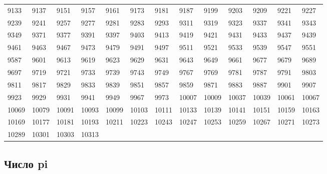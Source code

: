 \documentclass[12pt, a6paper]{extarticle}
\begin{document}
\begin{longtable}{lllll lllll lll}
9133 &9137 &9151 &9157 &9161 &9173 &9181 &9187 &9199 &9203 &9209 &9221 &9227 \\
9239 &9241 &9257 &9277 &9281 &9283 &9293 &9311 &9319 &9323 &9337 &9341 &9343 \\
9349 &9371 &9377 &9391 &9397 &9403 &9413 &9419 &9421 &9431 &9433 &9437 &9439 \\
9461 &9463 &9467 &9473 &9479 &9491 &9497 &9511 &9521 &9533 &9539 &9547 &9551 \\
9587 &9601 &9613 &9619 &9623 &9629 &9631 &9643 &9649 &9661 &9677 &9679 &9689 \\
9697 &9719 &9721 &9733 &9739 &9743 &9749 &9767 &9769 &9781 &9787 &9791 &9803 \\
9811 &9817 &9829 &9833 &9839 &9851 &9857 &9859 &9871 &9883 &9887 &9901 &9907 \\
9923 &9929 &9931 &9941 &9949 &9967 &9973 &10007 &10009 &10037 &10039 &10061 &10067 \\
10069 &10079 &10091 &10093 &10099 &10103 &10111 &10133 &10139 &10141 &10151 &10159 &10163 \\
10169 &10177 &10181 &10193 &10211 &10223 &10243 &10247 &10253 &10259 &10267 &10271 &10273 \\
10289 &10301 &10303 &10313 &


\end{longtable}

\normalsize

\subsection{Число pi}
\end{document}
